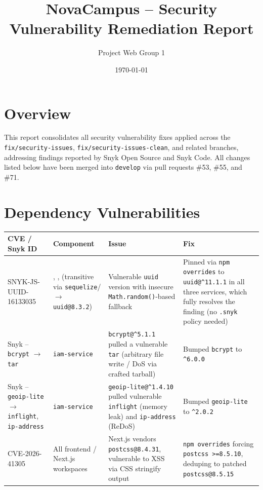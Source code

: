 \documentclass[11pt]{article}
\title{NovaCampus -- Security Vulnerability Remediation Report}
\author{Project Web Group 1}
\date{\today}
\begin{document}
\maketitle

\section*{Overview}

This report consolidates all security vulnerability fixes applied across the
\texttt{fix/security-issues}, \texttt{fix/security-issues-clean}, and related
branches, addressing findings reported by Snyk Open Source and Snyk Code. All
changes listed below have been merged into \texttt{develop} via pull requests
\#53, \#55, and \#71.

\section{Dependency Vulnerabilities}

\small
\begin{longtable}{L{3.0cm}L{3.4cm}L{4.4cm}L{4.8cm}}
\toprule
\textbf{CVE / Snyk ID} & \textbf{Component} & \textbf{Issue} & \textbf{Fix} \\
\midrule
\endhead

SNYK-JS-UUID-16133035 &
, ,  (transitive via \texttt{sequelize}/ $\rightarrow$ \texttt{uuid@8.3.2}) &
Vulnerable \texttt{uuid} version with insecure \texttt{Math.random()}-based fallback &
Pinned via \texttt{npm overrides} to \texttt{uuid@\^{}11.1.1} in all three services, which fully resolves the finding (no \texttt{.snyk} policy needed) \\
\addlinespace

Snyk -- \texttt{bcrypt} \(\rightarrow\) \texttt{tar} &
\texttt{iam-service} &
\texttt{bcrypt@\^{}5.1.1} pulled a vulnerable \texttt{tar} (arbitrary file write / DoS via crafted tarball) &
Bumped \texttt{bcrypt} to \texttt{\^{}6.0.0} \\
\addlinespace

Snyk -- \texttt{geoip-lite} \(\rightarrow\) \texttt{inflight}, \texttt{ip-address} &
\texttt{iam-service} &
\texttt{geoip-lite@\^{}1.4.10} pulled vulnerable \texttt{inflight} (memory leak) and \texttt{ip-address} (ReDoS) &
Bumped \texttt{geoip-lite} to \texttt{\^{}2.0.2} \\
\addlinespace

CVE-2026-41305 &
All frontend / Next.js workspaces &
Next.js vendors \texttt{postcss@8.4.31}, vulnerable to XSS via CSS stringify output &
\texttt{npm overrides} forcing \texttt{postcss >=8.5.10}, deduping to patched \texttt{postcss@8.5.15} \\

\bottomrule
\end{longtable}
\end{document}
